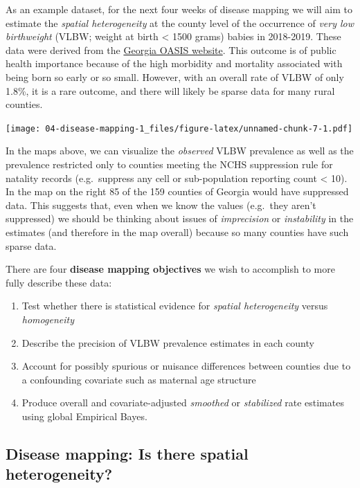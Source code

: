 \documentclass[
]{book}
\providecommand{\tightlist}{%
  \setlength{\itemsep}{0pt}\setlength{\parskip}{0pt}}
\newenvironment{rmdnote}[1]
  {
  \begin{itemize}
  \renewcommand{\labelitemi}{
    \raisebox{-.7\height}[0pt][0pt]{
      {\setkeys{Gin}{width=3em,keepaspectratio}\texttt{[image: images/\#1]}}
    }
  }
  \setlength{\fboxsep}{1em}
  \begin{note}
  \item
  }
  {
  \end{note}
  \end{itemize}
  }
\begin{document}
As an example dataset, for the next four weeks of disease mapping we will aim to estimate the \emph{spatial heterogeneity} at the county level of the occurrence of \emph{very low birthweight} (VLBW; weight at birth \textless{} 1500 grams) babies in 2018-2019. These data were derived from the \href{https://oasis.state.ga.us/}{Georgia OASIS website}. This outcome is of public health importance because of the high morbidity and mortality associated with being born so early or so small. However, with an overall rate of VLBW of only 1.8\%, it is a rare outcome, and there will likely be sparse data for many rural counties.

\texttt{[image: 04-disease-mapping-1\_files/figure-latex/unnamed-chunk-7-1.pdf]}

In the maps above, we can visualize the \emph{observed} VLBW prevalence as well as the prevalence restricted only to counties meeting the NCHS suppression rule for natality records (e.g.~suppress any cell or sub-population reporting count \textless{} 10). In the map on the right 85 of the 159 counties of Georgia would have suppressed data. This suggests that, even when we know the values (e.g.~they aren't suppressed) we should be thinking about issues of \emph{imprecision} or \emph{instability} in the estimates (and therefore in the map overall) because so many counties have such sparse data.

\begin{rmdnote}{note}

There are four \textbf{disease mapping objectives} we wish to accomplish to more fully describe these data:

\begin{enumerate}
\def\labelenumi{\arabic{enumi}.}
\tightlist
\item
  Test whether there is statistical evidence for \emph{spatial heterogeneity} versus \emph{homogeneity}
\item
  Describe the precision of VLBW prevalence estimates in each county
\item
  Account for possibly spurious or nuisance differences between counties due to a confounding covariate such as maternal age structure
\item
  Produce overall and covariate-adjusted \emph{smoothed} or \emph{stabilized} rate estimates using global Empirical Bayes.
\end{enumerate}

\end{rmdnote}

\hypertarget{disease-mapping-is-there-spatial-heterogeneity}{%
\subsection{Disease mapping: Is there spatial heterogeneity?}\label{disease-mapping-is-there-spatial-heterogeneity}}
\end{document}
